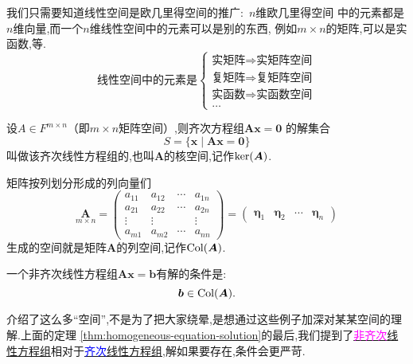 \documentclass[cn,10pt,citestyle=gb7714-2015,bibstyle=gb7714-2015]{elegantbook}
\begin{document}
\begin{definition}[线性空间]
  我们只需要知道线性空间是欧几里得空间的推广:\ $n$维欧几里得空间
  中的元素都是$n$维向量,而一个$n$维线性空间中的元素可以是别的东西,
  例如$m\times n$的矩阵,可以是实函数,等.
      \[\text{线性空间中的元素是}
          \begin{cases}
              \text{实矩阵}\Longrightarrow\text{实矩阵空间}\\
              \text{复矩阵}\Longrightarrow\text{复矩阵空间}\\
              \text{实函数}\Longrightarrow\text{实函数空间}\\
              \ldots
          \end{cases}
      \]
\end{definition}
\begin{definition}[齐次线性方程组的解空间]
  设$A\in F^{m\times n}$（即$m\times n$矩阵空间）,则齐次方程组$\bm{A}\bm{x}=\bm{0}$
  的解集合
  \[
      S=\{\bm{x}\mid\bm{A}\bm{x}=\bm{0}\}  
  \]
  叫做该齐次线性方程组的,也叫$\bm{A}$的核空间,记作$\textup{ker}(\bm{A})$.
\end{definition}
\begin{definition}\label{thm:homogeneous-equation-solution}
  矩阵按列划分形成的列向量们
  \[
      \underset{m\times n}{\bm{A}}=\begin{pmatrix}
          a_{11}&a_{12}&\cdots &a_{1n}\\
          a_{21}&a_{22}&\cdots &a_{2n}\\
          \vdots&\vdots& &\vdots\\
          a_{m1}&a_{m2}&\cdots &a_{nn}
      \end{pmatrix}  =\begin{pmatrix}
          \bm{\eta}_1&\bm{\eta}_2&\cdots &\bm{\eta}_n
      \end{pmatrix}
  \]
  生成的空间就是矩阵$\bm{A}$的列空间,记作$\textup{Col}(\bm{A})$.

  \textcolor{magenta}{\HandRight}一个非齐次线性方程组$\bm{A}\bm{x}=\bm{b}$有解的条件是:
  \[
      \bm{b}\in\textup{Col}(\bm{A}).  
  \]
\end{definition}
介绍了这么多“空间”,不是为了把大家绕晕,是想通过这些例子加深对某某空间的理解.上面的定理
\ref{thm:homogeneous-equation-solution}的最后,我们提到了\uline{\textcolor{magenta}{非齐次}线
性方程组}相对于\uline{\textcolor{blue}{齐次}线性方程组},解如果要存在,条件会更严苛.
\end{document}
